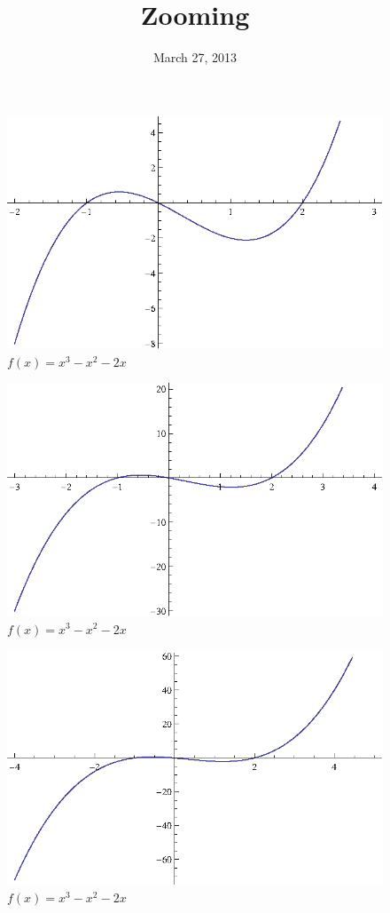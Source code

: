 \documentclass{article}
\title{Zooming}
\date{March 27, 2013}
\begin{document}
  \begin{figure}[H]
    \centering
    \includegraphics[scale=0.7]{zoom11.eps}
    \caption*{$f(x) = x^3 - x^2 - 2x$}
  \end{figure}

  \begin{figure}[H]
    \centering
    \includegraphics[scale=0.7]{zoom12.eps}
    \caption*{$f(x) = x^3 - x^2 - 2x$}
  \end{figure}

  \begin{figure}[H]
    \centering
    \includegraphics[scale=0.7]{zoom13.eps}
    \caption*{$f(x) = x^3 - x^2 - 2x$}
  \end{figure}
\end{document}
